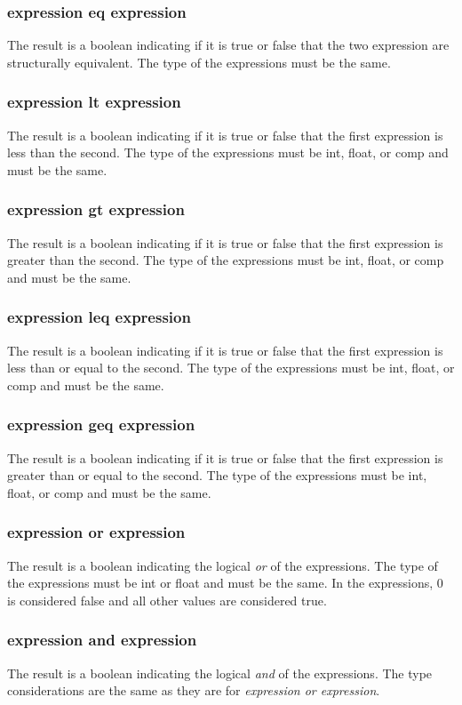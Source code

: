 \subsubsection{expression eq expression}
The result is a boolean indicating if it is true or false that the two expression are structurally equivalent. The type of the expressions must be the same.
\subsubsection{expression lt expression}
The result is a boolean indicating if it is true or false that the first expression is less than the second. The type of the expressions must be int, float, or comp and must be the same.
\subsubsection{expression gt expression}
The result is a boolean indicating if it is true or false that the first expression is greater than the second. The type of the expressions must be int, float, or comp and must be the same.
\subsubsection{expression leq expression}
The result is a boolean indicating if it is true or false that the first expression is less than  or equal to the second. The type of the expressions must be int, float, or comp and must be the same.
\subsubsection{expression geq expression}
The result is a boolean indicating if it is true or false that the first expression is greater than or equal to the second. The type of the expressions must be int, float, or comp and must be the same.
\subsubsection{expression or expression}
The result is a boolean indicating the logical \textit{or} of the expressions. The type of the expressions must be int or float and must be the same. In the expressions, 0 is considered false and all other values are considered true.
\subsubsection{expression and expression}
The result is a boolean indicating the logical \textit{and} of the expressions. The type considerations are the same as they are for \textit{expression or expression}.
